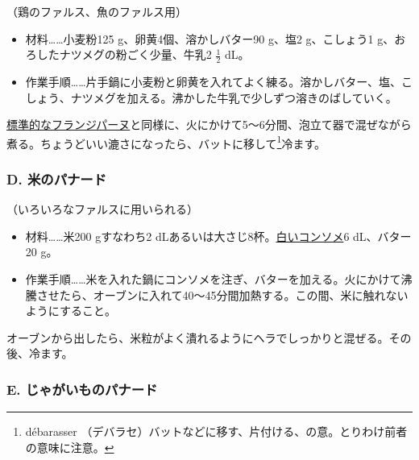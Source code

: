 \begin{recette}
（鶏のファルス、魚のファルス用）

\begin{itemize}
\item
  材料\ldots{}\ldots{}小麦粉125 g、卵黄4個、溶かしバター90 g、塩2
  g、こしょう1 g、おろしたナツメグの粉ごく少量、牛乳2 \(\frac{1}{2}\)
  dL。
\item
  作業手順\ldots{}\ldots{}片手鍋に小麦粉と卵黄を入れてよく練る。溶かしバター、塩、こしょう、ナツメグを加える。沸かした牛乳で少しずつ溶きのばしていく。
\end{itemize}

\protect\hyperlink{creme-frangipane}{標準的なフランジパーヌ}と同様に、火にかけて5〜6分間、泡立て器で混ぜながら煮る。ちょうどいい漉さになったら、バットに移して\footnote{débarasser
  （デバラセ）バットなどに移す、片付ける、の意。とりわけ前者の意味に注意。}冷ます。

\hypertarget{panade-d}{%
\subsubsection{D. 米のパナード}\label{panade-d}}



（いろいろなファルスに用いられる）

\begin{itemize}
\item
  材料\ldots{}\ldots{}米200 gすなわち2
  dLあるいは大さじ8杯。\protect\hyperlink{}{白いコンソメ}6 dL、バター20
  g。
\item
  作業手順\ldots{}\ldots{}米を入れた鍋にコンソメを注ぎ、バターを加える。火にかけて沸騰させたら、オーブンに入れて40〜45分間加熱する。この間、米に触れないようにすること。
\end{itemize}

オーブンから出したら、米粒がよく潰れるようにヘラでしっかりと混ぜる。その後、冷ます。

\hypertarget{panade-e}{%
\subsubsection{E. じゃがいものパナード}\label{panade-e}}


\end{recette}
